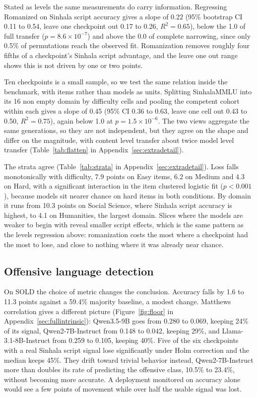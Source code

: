 \documentclass[11pt]{article}
\begin{document}
Stated as levels the same measurements do carry information. Regressing Romanized on
Sinhala script accuracy gives a slope of 0.22 (95\% bootstrap CI 0.11 to 0.54,
leave one checkpoint out 0.17 to 0.26, $R^2 = 0.65$), below the 1.0 of full transfer
($p = 8.6 \times 10^{-7}$) and above the 0.0 of complete narrowing, since only 0.5\% of
permutations reach the observed fit. Romanization removes roughly four fifths of a
checkpoint's Sinhala script advantage, and the leave one out range shows this is not
driven by one or two points.

Ten checkpoints is a small sample, so we test the same relation inside the benchmark,
with items rather than models as units. Splitting SinhalaMMLU into its 16 non empty domain
by difficulty cells and pooling the competent cohort within each gives a slope of 0.45
(95\% CI 0.36 to 0.63, leave one cell out 0.43 to 0.50, $R^2 = 0.75$), again below 1.0 at
$p = 1.5 \times 10^{-6}$. The two views aggregate the same generations, so they are not
independent, but they agree on the shape and differ on the magnitude, with content level
transfer about twice model level transfer (Table~\ref{tab:flatten} in
Appendix~\ref{sec:extradetail}).

The strata agree (Table~\ref{tab:strata} in Appendix~\ref{sec:extradetail}). Loss falls monotonically with
difficulty, 7.9 points on Easy items, 6.2 on Medium and 4.3 on Hard, with a significant
interaction in the item clustered logistic fit ($p < 0.001$), because models sit nearer
chance on hard items in both conditions. By domain it runs from 10.3 points on Social
Science, where Sinhala script accuracy is highest, to 4.1 on Humanities, the largest
domain. Slices where the models are weaker to begin with reveal smaller script effects,
which is the same pattern as the levels regression above: romanization costs the most
where a checkpoint had the most to lose, and close to nothing where it was already near
chance.

\subsection{Offensive language detection}

On SOLD the choice of metric changes the conclusion. Accuracy falls by 1.6 to 11.3
points against a 59.4\% majority baseline, a modest change. Matthews correlation gives a
different picture (Figure~\ref{fig:floor} in Appendix~\ref{sec:fullintrinsic}): Qwen3.5-9B goes from 0.280 to 0.069,
keeping 24\% of its signal, Qwen2-7B-Instruct from 0.148 to 0.042, keeping 29\%, and
Llama-3.1-8B-Instruct from 0.259 to 0.105, keeping 40\%. Five of the six checkpoints with
a real Sinhala script signal lose significantly under Holm correction and the median keeps
45\%. They drift toward trivial behavior instead, Qwen2-7B-Instruct more than doubles its
rate of predicting the offensive class, 10.5\% to 23.4\%, without becoming more accurate.
A deployment monitored on accuracy alone would see a few points of movement while over
half the usable signal was lost.
\end{document}
